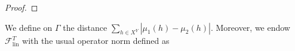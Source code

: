 \documentclass[11pt]{article}
\newcommand{\R}{\mathbb{R}}
\newcommand{\p}{\varphi}
\newcommand{\pat}[1]{\todo[author=Patrizio]{#1}}
\begin{document}
{\begin{proof}






\end{proof}

We define on $\Gamma$ the  
distance $\sum_{h \in X^Y} |\mu_1(h)-\mu_2(h)|$.
Moreover, we endow $\mathcal{F}_\mathrm{lin}^T$ with the usual operator norm defined as

}
\end{document}
